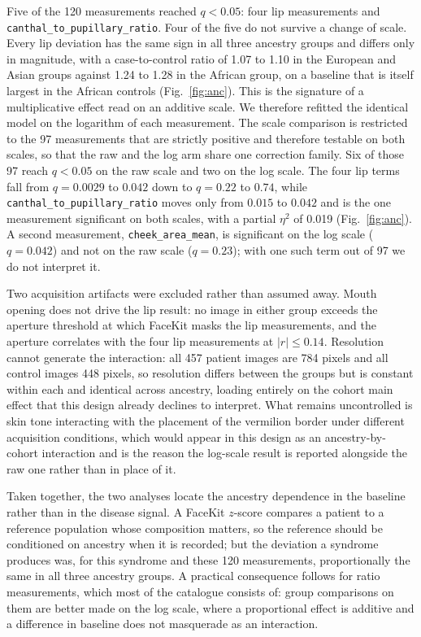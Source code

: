 \documentclass[11pt]{article}
\begin{document}
Five of the 120 measurements reached $q < 0.05$: four lip measurements and
\texttt{canthal\_to\_pupillary\_ratio}. Four of the five do not survive a change
of scale. Every lip deviation has the same sign in all three ancestry groups and
differs only in magnitude, with a case-to-control ratio of 1.07 to 1.10 in the
European and Asian groups against 1.24 to 1.28 in the African group, on a
baseline that is itself largest in the African controls
(Fig.~\ref{fig:anc}). This is the signature of a
multiplicative effect read on an additive scale. We therefore refitted the
identical model on the logarithm of each measurement. The scale comparison is
restricted to the 97 measurements that are strictly positive and therefore
testable on both scales, so that the raw and the log arm share one correction
family. Six of those 97 reach $q < 0.05$ on the raw scale and two on the log
scale. The four lip terms fall from $q = 0.0029$ to $0.042$ down to $q = 0.22$ to
$0.74$, while \texttt{canthal\_to\_pupillary\_ratio} moves only from $0.015$ to
$0.042$ and is the one measurement significant on both scales, with a partial
$\eta^2$ of 0.019 (Fig.~\ref{fig:anc}). A second
measurement, \texttt{cheek\_area\_mean}, is
significant on the log scale ($q = 0.042$) and not on the raw scale
($q = 0.23$); with one such term out of 97 we do not interpret it.

Two acquisition artifacts were excluded rather than assumed away. Mouth opening
does not drive the lip result: no image in either group exceeds the aperture
threshold at which FaceKit masks the lip measurements, and the aperture
correlates with the four lip measurements at $|r| \le 0.14$. Resolution cannot
generate the interaction: all 457 patient images are 784 pixels and all control
images 448 pixels, so resolution differs between the groups but is constant
within each and identical across ancestry, loading entirely on the cohort main
effect that this design already declines to interpret. What remains uncontrolled
is skin tone interacting with the placement of the vermilion border under
different acquisition conditions, which would appear in this design as an
ancestry-by-cohort interaction and is the reason the log-scale result is
reported alongside the raw one rather than in place of it.

Taken together, the two analyses locate the ancestry dependence in the baseline
rather than in the disease signal. A FaceKit $z$-score compares a patient to a
reference population whose composition matters, so the reference should be
conditioned on ancestry when it is recorded; but the deviation a syndrome
produces was, for this syndrome and these 120 measurements, proportionally the
same in all three ancestry groups. A practical consequence follows for ratio
measurements, which most of the catalogue consists of: group comparisons on
them are better made on the log scale, where a proportional effect is additive
and a difference in baseline does not masquerade as an interaction.
\end{document}
